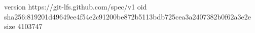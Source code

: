 version https://git-lfs.github.com/spec/v1
oid sha256:819201d49649ee4f54e2c91200be872b5113bdb725cea3a2407382b0f62a3e2e
size 4103747

